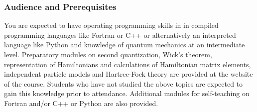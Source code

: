 \documentclass{beamer}
\begin{document}
\begin{frame}
\frametitle{Audience and Prerequisites}

\begin{block}{}

You are expected to have operating programming skills in in
compiled programming languages like Fortran or C++ or alternatively an
interpreted language like Python and knowledge of quantum mechanics at
an intermediate level.  Preparatory modules on second quantization,
Wick's theorem, representation of Hamiltonians and calculations of
Hamiltonian matrix elements, independent particle models and
Hartree-Fock theory are provided at the website of the course.
Students who have not studied the above topics are expected to gain
this knowledge prior to attendance.  Additional modules for
self-teaching on Fortran and/or C++ or Python are also provided.

\end{block}
\end{frame}
\end{document}
